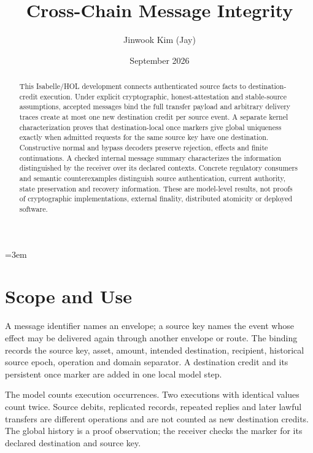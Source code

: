 \documentclass[11pt,a4paper]{article}
\begin{document}
\emergencystretch=3em
\title{Cross-Chain Message Integrity}
\author{Jinwook Kim (Jay)}
\date{September 2026}
\maketitle

\begin{abstract}
This Isabelle/HOL development connects authenticated source facts to
destination-credit execution. Under explicit cryptographic, honest-attestation
and stable-source assumptions, accepted messages bind the full transfer
payload and arbitrary delivery traces create at most one new destination
credit per source event. A separate kernel characterization proves that
destination-local once markers give global uniqueness exactly when admitted
requests for the same source key have one destination. Constructive normal
and bypass decoders preserve rejection, effects and finite continuations.
A checked internal message summary characterizes the information distinguished
by the receiver over its declared contexts. Concrete regulatory consumers and
semantic counterexamples distinguish source authentication, current authority,
state preservation and recovery information. These are model-level results,
not proofs of cryptographic implementations, external finality, distributed
atomicity or deployed software.
\end{abstract}

\clearpage
\tableofcontents
\clearpage

\section{Scope and Use}

A message identifier names an envelope; a source key names the event whose
effect may be delivered again through another envelope or route. The binding
records the source key, asset, amount, intended destination, recipient,
historical source epoch, operation and domain separator. A destination credit
and its persistent once marker are added in one local model step.

The model counts execution occurrences. Two executions with identical values
count twice. Source debits, replicated records, repeated replies and later
lawful transfers are different operations and are not counted as new
destination credits. The global history is a proof observation; the receiver
checks the marker for its declared destination and source key.
\end{document}
